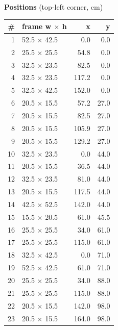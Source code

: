 \documentclass[a4paper,landscape,10pt]{article}
\begin{document}
\begin{minipage}[t]{0.25\textwidth}
\vspace{8pt}
{\bfseries Positions} (top-left corner, cm)\\[2pt]
\tiny
\begin{tabular}{@{}r l r r@{}}
\toprule
\# & frame w $\times$ h & x & y \\
\midrule
1 & 52.5 $\times$ 42.5 & 0.0 & 0.0 \\
2 & 25.5 $\times$ 25.5 & 54.8 & 0.0 \\
3 & 32.5 $\times$ 23.5 & 82.5 & 0.0 \\
4 & 32.5 $\times$ 23.5 & 117.2 & 0.0 \\
5 & 32.5 $\times$ 42.5 & 152.0 & 0.0 \\
6 & 20.5 $\times$ 15.5 & 57.2 & 27.0 \\
7 & 20.5 $\times$ 15.5 & 82.5 & 27.0 \\
8 & 20.5 $\times$ 15.5 & 105.9 & 27.0 \\
9 & 20.5 $\times$ 15.5 & 129.2 & 27.0 \\
10 & 32.5 $\times$ 23.5 & 0.0 & 44.0 \\
11 & 20.5 $\times$ 15.5 & 36.5 & 44.0 \\
12 & 32.5 $\times$ 23.5 & 81.0 & 44.0 \\
13 & 20.5 $\times$ 15.5 & 117.5 & 44.0 \\
14 & 42.5 $\times$ 52.5 & 142.0 & 44.0 \\
15 & 15.5 $\times$ 20.5 & 61.0 & 45.5 \\
16 & 25.5 $\times$ 25.5 & 34.0 & 61.0 \\
17 & 25.5 $\times$ 25.5 & 115.0 & 61.0 \\
18 & 32.5 $\times$ 42.5 & 0.0 & 71.0 \\
19 & 52.5 $\times$ 42.5 & 61.0 & 71.0 \\
20 & 25.5 $\times$ 25.5 & 34.0 & 88.0 \\
21 & 25.5 $\times$ 25.5 & 115.0 & 88.0 \\
22 & 20.5 $\times$ 15.5 & 142.0 & 98.0 \\
23 & 20.5 $\times$ 15.5 & 164.0 & 98.0 \\
\bottomrule
\end{tabular}
\end{minipage}
\clearpage
\end{document}
